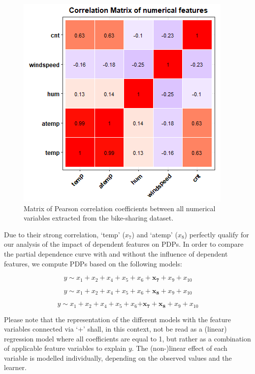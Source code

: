 \documentclass[]{krantz}
\begin{document}
\begin{figure}

{\centering \includegraphics[width=0.8\linewidth]{images/VK_PDP_3_Num_Correlation_Matrix} 

}

\caption{Matrix of Pearson correlation coefficients between all numerical variables extracted from the bike-sharing dataset.}\label{fig:Figure03}
\end{figure}

Due to their strong correlation, `temp' (\(x_7\)) and `atemp' (\(x_8\))
perfectly qualify for our analysis of the impact of dependent features
on PDPs. In order to compare the partial dependence curve with and
without the influence of dependent features, we compute PDPs based on
the following models:

\begin{equation}
 y \sim x_1 + x_2 + x_4 + x_5 + x_6 + \mathbf{x_7}  + x_9 + x_{10} \label{eq:1} 
\end{equation}

\begin{equation}
 y \sim x_1 + x_2 + x_4 + x_5 + x_6 + \mathbf{x_8}  + x_9 + x_{10} \label{eq:2}
\end{equation}

\begin{equation}
 y \sim x_1 + x_2 + x_4 + x_5 + x_6 \mathbf{+ x_7 + x_8} + x_9 + x_{10} \label{eq:3}
\end{equation}

Please note that the representation of the different models with the
feature variables connected via `+' shall, in this context, not be read
as a (linear) regression model where all coefficients are equal to 1,
but rather as a combination of applicable feature variables to explain
\(y\). The (non-)linear effect of each variable is modelled
individually, depending on the observed values and the learner.
\end{document}
